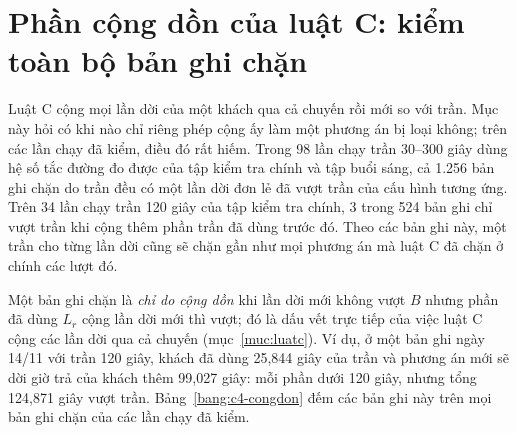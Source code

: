 \section{Phần cộng dồn của luật C: kiểm toàn bộ bản ghi chặn}
\label{muc:c4-congdon}

Luật C cộng mọi lần dời của một khách qua cả chuyến rồi mới so với trần. Mục này hỏi có khi nào chỉ riêng phép cộng
ấy làm một phương án bị loại không; trên các lần chạy đã kiểm, điều đó rất hiếm. Trong 98 lần chạy trần 30--300 giây
dùng hệ số tắc đường đo được của tập kiểm tra chính và tập buổi sáng, cả 1.256 bản ghi chặn do trần đều có một lần
dời đơn lẻ đã vượt trần của cấu hình tương ứng. Trên 34 lần chạy trần 120 giây của tập kiểm tra chính, 3 trong 524 bản
ghi chỉ vượt trần khi cộng thêm phần trần đã dùng trước đó. Theo các bản ghi này, một trần cho từng lần dời cũng sẽ
chặn gần như mọi phương án mà luật C đã chặn ở chính các lượt đó.

Một bản ghi chặn là \emph{chỉ do cộng dồn} khi lần dời mới không vượt $B$ nhưng phần đã dùng $L_r$ cộng lần dời mới
thì vượt; đó là dấu vết trực tiếp của việc luật C cộng các lần dời qua cả chuyến (mục~\ref{muc:luatc}). Ví dụ, ở một
bản ghi ngày 14/11 với trần 120 giây, khách đã dùng 25,844 giây của trần và phương án mới sẽ dời giờ trả của khách
thêm 99,027 giây: mỗi phần dưới 120 giây, nhưng tổng 124,871 giây vượt trần. Bảng~\ref{bang:c4-congdon} đếm các bản
ghi này trên mọi bản ghi chặn của các lần chạy đã kiểm.

